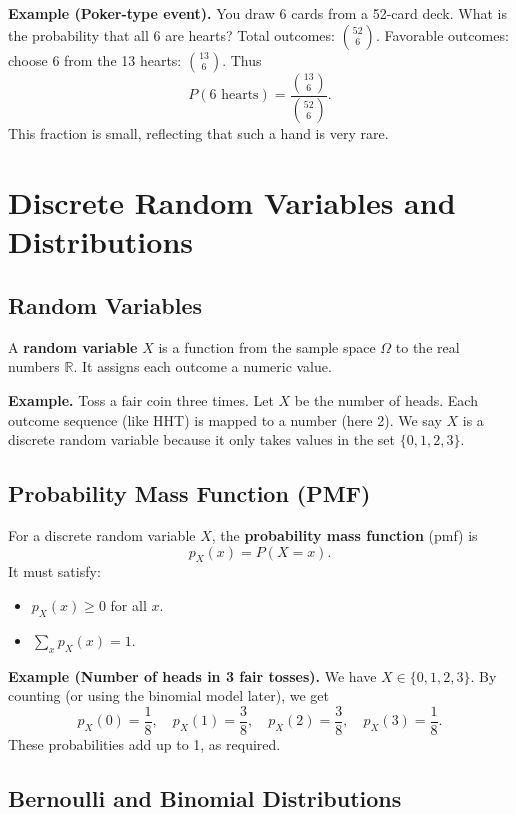 \documentclass[11pt,a4paper]{article}
\begin{document}
\textbf{Example (Poker-type event).}  
You draw 6 cards from a 52-card deck.  
What is the probability that all 6 are hearts?  
Total outcomes: \(\binom{52}{6}\).  
Favorable outcomes: choose 6 from the 13 hearts: \(\binom{13}{6}\).  
Thus
\[
P(\text{6 hearts}) = \frac{\binom{13}{6}}{\binom{52}{6}}.
\]
This fraction is small, reflecting that such a hand is very rare.

\newpage

\section{Discrete Random Variables and Distributions}

\subsection{Random Variables}

A \textbf{random variable} \(X\) is a function from the sample space \(\Omega\) to the real numbers \(\mathbb{R}\).  
It assigns each outcome a numeric value.

\textbf{Example.}  
Toss a fair coin three times.  
Let \(X\) be the number of heads.  
Each outcome sequence (like HHT) is mapped to a number (here 2).  
We say \(X\) is a discrete random variable because it only takes values in the set \(\{0,1,2,3\}\).

\subsection{Probability Mass Function (PMF)}

For a discrete random variable \(X\), the \textbf{probability mass function} (pmf) is
\[
p_X(x) = P(X = x).
\]
It must satisfy:
\begin{itemize}
    \item \(p_X(x) \ge 0\) for all \(x\).
    \item \(\sum_{x} p_X(x) = 1\).
\end{itemize}

\textbf{Example (Number of heads in 3 fair tosses).}  
We have \(X \in \{0,1,2,3\}\).  
By counting (or using the binomial model later), we get
\[
p_X(0) = \frac{1}{8},\quad
p_X(1) = \frac{3}{8},\quad
p_X(2) = \frac{3}{8},\quad
p_X(3) = \frac{1}{8}.
\]
These probabilities add up to 1, as required.

\subsection{Bernoulli and Binomial Distributions}
\end{document}
